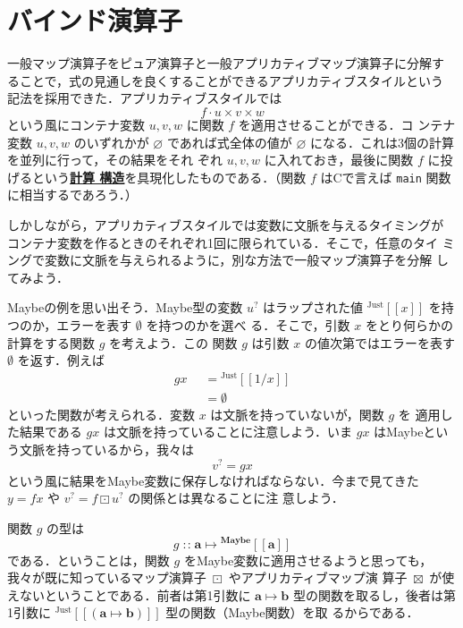 \documentclass[a5paper,twoside,fleqn,draft]{jsbook}
\def\[{\left[\!\left[}
\def\]{\right]\!\right]}
\newcommand{\programminglanguage}[1]{\textsf{#1}}
\newcommand{\clang}{\programminglanguage{C}}
\newcommand{\keyword}[1]{{\underline{\textbf{#1}}}}
\newcommand{\code}[1]{\texttt{#1}}
\newcommand{\mKeyword}[1]{\mathsf{#1}} %
\newcommand{\mOtherwiseKeyword}{\mKeyword{otherwise}}
\DeclareMathOperator{\mOtherwise}{\mOtherwiseKeyword}
\newcommand{\mNothing}{\emptyset}
\newcommand{\mPureNothing}{\varnothing}
\DeclareMathOperator{\mAppMap}{\times}
\DeclareMathOperator{\mAppMapMaybe}{\boxtimes}
\DeclareMathOperator{\mIn}{{:\!:}}
\DeclareMathOperator{\mMap}{\cdot} %
\DeclareMathOperator{\mMapMaybe}{\boxdot}
\DeclareMathOperator{\mMapsTo}{\mapsto}
\newcommand{\mType}[1]{\mathbf{#1}}
\newcommand{\mGenericTypeAssemble}[2]{{}^{\mType{#1}}\[\mType{#2}\]}
\newcommand{\mMaybeType}[1]{\mGenericTypeAssemble{Maybe}{#1}}
\newcommand{\mValueConstructor}[1]{\mathrm{#1}}
\newcommand{\mGenericValueAssemble}[2]{{}^\mValueConstructor{#1}\[#2\]}
\newcommand{\mJustWith}[1]{\mGenericValueAssemble{Just}{#1}}
\newcommand{\mMaybe}[1]{{#1}^?}
\newcommand{\mGuard}[1]{\mathop{\mid_{#1}}}
\newcommand{\mProj}[2]{#1\mMapsTo#2}
\begin{document}
\section{バインド演算子}

一般マップ演算子をピュア演算子と一般アプリカティブマップ演算子に分解す
ることで，式の見通しを良くすることができるアプリカティブスタイルという
記法を採用できた．アプリカティブスタイルでは
\begin{equation}
  f\mMap u\mAppMap v\mAppMap w
\end{equation}
という風にコンテナ変数 $u,v,w$ に関数 $f$ を適用させることができる．コ
ンテナ変数 $u,v,w$ のいずれかが $\mPureNothing$ であれば式全体の値が
$\mPureNothing$ になる．これは3個の計算を並列に行って，その結果をそれ
ぞれ $u,v,w$ に入れておき，最後に関数 $f$ に投げるという\keyword{計算
構造}を具現化したものである．（関数 $f$ は\clang で言えば
\code{main} 関数に相当するであろう．）

しかしながら，アプリカティブスタイルでは変数に文脈を与えるタイミングが
コンテナ変数を作るときのそれぞれ1回に限られている．そこで，任意のタイ
ミングで変数に文脈を与えられるように，別な方法で一般マップ演算子を分解
してみよう．

Maybeの例を思い出そう．Maybe型の変数 $\mMaybe{u}$ はラップされた値
$\mJustWith{x}$ を持つのか，エラーを表す $\mNothing$ を持つのかを選べ
る．そこで，引数 $x$ をとり何らかの計算をする関数 $g$ を考えよう．この
関数 $g$ は引数 $x$ の値次第ではエラーを表す $\mNothing$ を返す．例えば
\begin{equation}
  \begin{aligned}
    gx&\mGuard{x\neq0}=\mJustWith{1/x}\\
    &\mGuard{\mOtherwise}=\mNothing
  \end{aligned}
\end{equation}
といった関数が考えられる．変数 $x$ は文脈を持っていないが，関数 $g$ を
適用した結果である $gx$ は文脈を持っていることに注意しよう．いま $gx$
はMaybeという文脈を持っているから，我々は
\begin{equation}
\mMaybe{v}=gx
\end{equation}
という風に結果をMaybe変数に保存しなければならない．今まで見てきた
$y=fx$ や $\mMaybe{v}=f\mMapMaybe\mMaybe{u}$ の関係とは異なることに注
意しよう．

関数 $g$ の型は
\begin{equation}
  g\mIn\mProj{\mType{a}}{\mMaybeType{a}}
\end{equation}
である．ということは，関数 $g$ をMaybe変数に適用させるようと思っても，
我々が既に知っているマップ演算子 $\mMapMaybe$ やアプリカティブマップ演
算子 $\mAppMapMaybe$ が使えないということである．前者は第1引数に
$\mProj{\mType{a}}{\mType{b}}$ 型の関数を取るし，後者は第1引数に
$\mJustWith{(\mProj{\mType{a}}{\mType{b}})}$ 型の関数（Maybe関数）を取
るからである．
\end{document}

